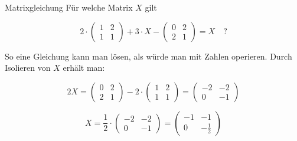 \begin{bsp}
    {Matrixgleichung}{}
    Für welche Matrix \( X \) gilt

    \[
    2 \cdot 
    \begin{pmatrix} 1 & 2 \\ 1 & 1 \end{pmatrix} 
    + 3 \cdot X 
    - \begin{pmatrix} 0 & 2 \\ 2 & 1 \end{pmatrix} 
    = X \quad ?
    \]

    So eine Gleichung kann man lösen, als würde man mit Zahlen operieren. Durch Isolieren von \( X \) erhält man:

    \[
    2X = \begin{pmatrix} 0 & 2 \\ 2 & 1 \end{pmatrix} 
    - 2 \cdot \begin{pmatrix} 1 & 2 \\ 1 & 1 \end{pmatrix} = \begin{pmatrix} -2 & -2 \\ 0 & -1 \end{pmatrix}
    \]


    \[
    X = \frac{1}{2} \cdot \begin{pmatrix} -2 & -2 \\ 0 & -1 \end{pmatrix}
    = \begin{pmatrix} -1 & -1 \\ 0 & -\frac{1}{2} \end{pmatrix}
    \]
\end{bsp}

